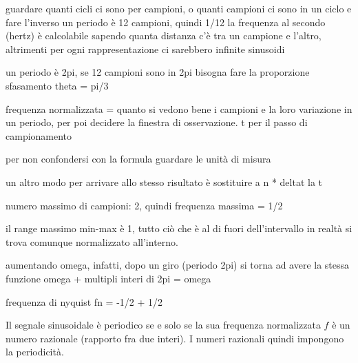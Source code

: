 guardare quanti cicli ci sono per campioni, o quanti campioni ci sono in un ciclo e fare l'inverso
un periodo è 12 campioni, quindi 1/12
la frequenza al secondo (hertz) è calcolabile sapendo quanta distanza c'è tra un campione e l'altro, altrimenti per ogni rappresentazione ci sarebbero infinite sinusoidi

un periodo è 2pi, se 12 campioni sono in 2pi bisogna fare la proporzione
sfasamento theta = pi/3

frequenza normalizzata = quanto si vedono bene i campioni e la loro variazione in un periodo, per poi decidere la finestra di osservazione. t per il passo di campionamento

per non confondersi con la formula guardare le unità di misura

un altro modo per arrivare allo stesso risultato è sostituire a n * deltat la t

numero massimo di campioni: 2, quindi frequenza massima = 1/2

il range massimo min-max è 1, tutto ciò che è al di fuori dell'intervallo in realtà si trova comunque normalizzato all'interno.

aumentando omega, infatti, dopo un giro (periodo 2pi) si torna ad avere la stessa funzione
omega + multipli interi di 2pi = omega

frequenza di nyquist fn = -1/2 + 1/2

Il segnale sinusoidale è periodico se e solo se la sua frequenza normalizzata $f$ è un numero razionale (rapporto fra due interi). I numeri razionali quindi impongono la periodicità. 
